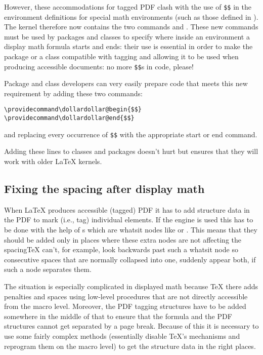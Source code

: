 \documentclass{ltnews}
\providecommand\Dash {\unskip \textemdash}
\providecommand\pdfTeX{\hologo{pdfTeX}}
\begin{document}
However, these accommodations for tagged PDF clash with 
the use of \verb=$$= in the environment definitions for special
math environments (such as those defined in ). 
The kernel therefore now contains the two commands
 and .  These new commands
must be used by packages and classes to specify where
inside an environment
a display math
formula starts and ends: their use is essential in order to make the
package or a class compatible with tagging and allowing it to be used
when producing accessible documents: no more \texttt{\$\$}s
in code, please! 

Package and class developers can very easily prepare code that 
meets this new requirement by adding these two commands:
\begin{verbatim}
\providecommand\dollardollar@begin{$$}
\providecommand\dollardollar@end{$$}
\end{verbatim}
and replacing every occurrence of \verb=$$= with the appropriate start or
end command.

Adding these  lines to
classes and packages doesn't hurt but ensures that they will work with older \LaTeX{}
kernels.



\subsection{Fixing the spacing after display math}

When \LaTeX{} produces accessible (tagged) PDF it has to add structure
data in the PDF to mark (i.e., tag) individual elements. If the
\pdfTeX{} engine is used this has to be done with the help of
s which are whatsit nodes like  or
. This means that they should be added only in places where
these extra nodes are not affecting the spacing\Dash \TeX{} can't, for
example, look backwards past such a whatsit node so consecutive spaces
that are normally collapsed into one, suddenly appear both, if such a
node separates them.

The situation is especially complicated in displayed math because
\TeX{} there adds penalties and spaces using low-level procedures that
are not directly accessible from the macro level.  Moreover, the PDF
tagging structures have to be added somewhere in the middle of that to
ensure that the formula and the PDF structures cannot get separated by
a page break. Because of this it is necessary to use some fairly
complex methods (essentially disable \TeX's mechanisms and reprogram
them on the macro level) to get the structure data in the right
places.
\end{document}
